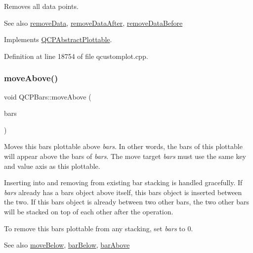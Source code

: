 Removes all data points. \begin{DoxySeeAlso}{See also}
\hyperlink{class_q_c_p_bars_a1fe9bcb57d670defea1bb65cadf43765}{remove\+Data}, \hyperlink{class_q_c_p_bars_a99de6e7abbbf03fb41fa604c7f08aa8b}{remove\+Data\+After}, \hyperlink{class_q_c_p_bars_a9d12779a3fad4820aad2c428f368298d}{remove\+Data\+Before} 
\end{DoxySeeAlso}


Implements \hyperlink{class_q_c_p_abstract_plottable_a86e5b8fd4b6ff4f4084e7ea4c573fc53}{Q\+C\+P\+Abstract\+Plottable}.



Definition at line 18754 of file qcustomplot.\+cpp.

\mbox{\label{class_q_c_p_bars_ac22e00a6a41509538c21b04f0a57318c}} 
\subsubsection{\texorpdfstring{move\+Above()}{moveAbove()}}
{\footnotesize\ttfamily void Q\+C\+P\+Bars\+::move\+Above (\begin{DoxyParamCaption}\item[{\hyperlink{class_q_c_p_bars}{Q\+C\+P\+Bars} $\ast$}]{bars }\end{DoxyParamCaption})}

Moves this bars plottable above {\itshape bars}. In other words, the bars of this plottable will appear above the bars of {\itshape bars}. The move target {\itshape bars} must use the same key and value axis as this plottable.

Inserting into and removing from existing bar stacking is handled gracefully. If {\itshape bars} already has a bars object above itself, this bars object is inserted between the two. If this bars object is already between two other bars, the two other bars will be stacked on top of each other after the operation.

To remove this bars plottable from any stacking, set {\itshape bars} to 0.

\begin{DoxySeeAlso}{See also}
\hyperlink{class_q_c_p_bars_a69fc371346980f19177c3d1ecdad78ee}{move\+Below}, \hyperlink{class_q_c_p_bars_a1b58664864b141f45e02044a855b3213}{bar\+Below}, \hyperlink{class_q_c_p_bars_ab97f2acd9f6cb40d2cc3c33d278f0e78}{bar\+Above} 
\end{DoxySeeAlso}


